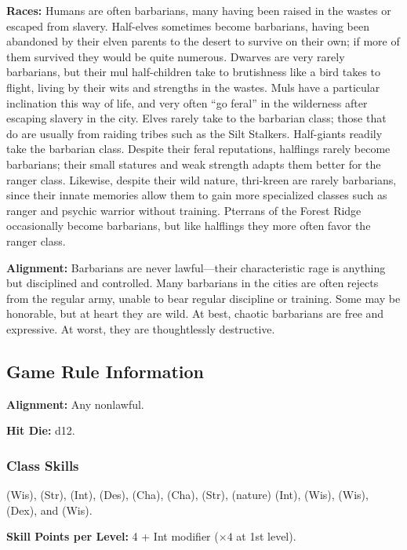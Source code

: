 \textbf{Races:} Humans are often barbarians, many having been raised in the wastes or escaped from slavery. Half-elves sometimes become barbarians, having been abandoned by their elven parents to the desert to survive on their own; if more of them survived they would be quite numerous. Dwarves are very rarely barbarians, but their mul half-children take to brutishness like a bird takes to flight, living by their wits and strengths in the wastes. Muls have a particular inclination this way of life, and very often ``go feral'' in the wilderness after escaping slavery in the city. Elves rarely take to the barbarian class; those that do are usually from raiding tribes such as the Silt Stalkers. Half-giants readily take the barbarian class. Despite their feral reputations, halflings rarely become barbarians; their small statures and weak strength adapts them better for the ranger class. Likewise, despite their wild nature, thri-kreen are rarely barbarians, since their innate memories allow them to gain more specialized classes such as ranger and psychic warrior without training. Pterrans of the Forest Ridge occasionally become barbarians, but like halflings they more often favor the ranger class.

\textbf{Alignment:} Barbarians are never lawful---their characteristic rage is anything but disciplined and controlled. Many barbarians in the cities are often rejects from the regular army, unable to bear regular discipline or training. Some may be honorable, but at heart they are wild. At best, chaotic barbarians are free and expressive. At worst, they are thoughtlessly destructive.

\subsection{Game Rule Information}
\textbf{Alignment:} Any nonlawful.

\textbf{Hit Die:} d12.

\subsubsection{Class Skills}
 (Wis),  (Str),  (Int),  (Des),  (Cha),  (Cha),  (Str),  (nature) (Int),  (Wis),  (Wis),  (Dex), and  (Wis).

\textbf{Skill Points per Level:} 4 + Int modifier ($\times4$ at 1st level).

